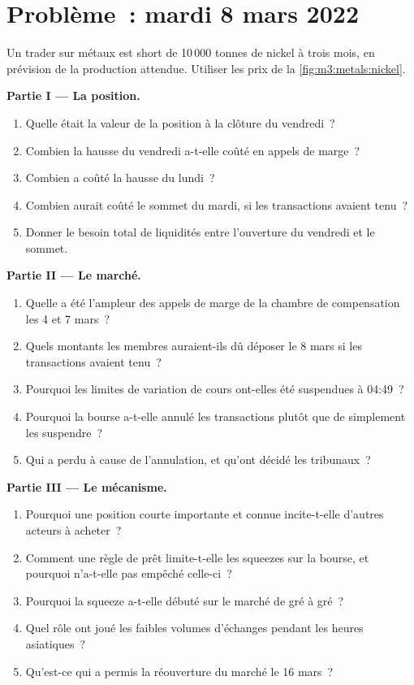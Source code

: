 \section{Problème~: mardi 8 mars 2022}

\begin{problem}\label{pb:m3:metals:1}
Un trader sur métaux est short de 10\,000 tonnes de nickel à trois mois, en prévision de la production attendue. Utiliser les
prix de la \cref{fig:m3:metals:nickel}.

\medskip\noindent\textbf{Partie I --- La position.}
\begin{enumerate}
\item Quelle était la valeur de la position à la clôture du vendredi~?
\item Combien la hausse du vendredi a-t-elle coûté en appels de marge~?
\item Combien a coûté la hausse du lundi~?
\item Combien aurait coûté le sommet du mardi, si les transactions avaient tenu~?
\item Donner le besoin total de liquidités entre l'ouverture du vendredi et le sommet.
\end{enumerate}

\medskip\noindent\textbf{Partie II --- Le marché.}
\begin{enumerate}[resume]
\item Quelle a été l'ampleur des appels de marge de la chambre de compensation les 4 et 7 mars~?
\item Quels montants les membres auraient-ils dû déposer le 8 mars si les transactions avaient tenu~?
\item Pourquoi les limites de variation de cours ont-elles été suspendues à 04:49~?
\item Pourquoi la bourse a-t-elle annulé les transactions plutôt que de simplement les suspendre~?
\item Qui a perdu à cause de l'annulation, et qu'ont décidé les tribunaux~?
\end{enumerate}

\medskip\noindent\textbf{Partie III --- Le mécanisme.}
\begin{enumerate}[resume]
\item Pourquoi une position courte importante et connue incite-t-elle d'autres acteurs à acheter~?
\item Comment une règle de prêt limite-t-elle les squeezes sur la bourse, et pourquoi n'a-t-elle pas empêché celle-ci~?
\item Pourquoi la squeeze a-t-elle débuté sur le marché de gré à gré~?
\item Quel rôle ont joué les faibles volumes d'échanges pendant les heures asiatiques~?
\item Qu'est-ce qui a permis la réouverture du marché le 16 mars~?
\end{enumerate}


\end{problem}
